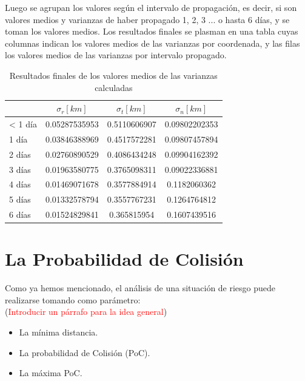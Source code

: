Luego se agrupan los valores seg\'un el intervalo de propagaci\'on, es decir, si son valores medios y varianzas de haber propagado 1, 2, 3 ... o hasta 6 d\'ias, y se toman los valores medios. Los resultados finales se plasman en una tabla cuyas columnas indican los valores medios de las varianzas por coordenada, y las filas los valores medios de las varianzas por intervalo propagado.\\

\begin{table}[!h]
\centering
\caption[Tabla con los valores medios para la propagaci\'on de errores.]{Resultados finales de los valores medios de las varianzas calculadas}
\begin{tabular}{|l|ccc|}
\hline
&$\sigma_r [km]$ &$\sigma_t [km]$ &$\sigma_n [km]$\\
\hline
< 1 d\'ia & 0.05287535953&0.5110606907&0.09802202353\\
1 d\'ia & 0.03846388969&0.4517572281&0.09807457894\\
2 d\'ias & 0.02760890529&0.4086434248&0.09904162392\\
3 d\'ias & 0.01963580775&0.3765098311&0.09022336881\\
4 d\'ias & 0.01469071678&0.3577884914&0.1182060362\\
5 d\'ias & 0.01332578794&0.3557767231&0.1264764812\\
6 d\'ias & 0.01524829841&0.365815954&0.1607439516\\
\hline
\end{tabular}
\label{tab:resultatabla}
\end{table}

\vspace{7cm}
\section{La Probabilidad de Colisi\'on}

Como ya hemos mencionado, el an\'alisis de una situaci\'on de riesgo puede realizarse tomando como par\'ametro:\\
(\textcolor{red}{Introducir un p\'arrafo para la idea general})

\begin{itemize}
\itemsep0em
\item La m\'inima distancia.
\item La probabilidad de Colisi\'on (PoC).
\item La m\'axima PoC.
\end{itemize}

